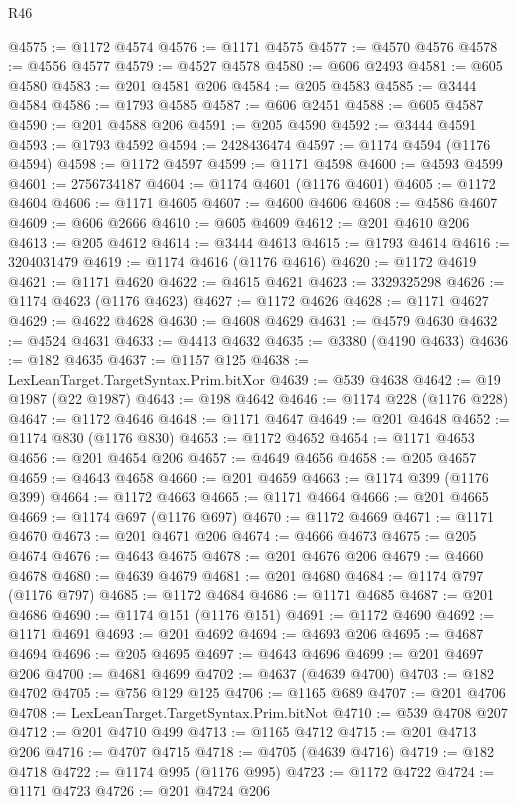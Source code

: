 \begin{lexlean}{R46}
\begin{coremodule}
@4575 := @1172 @4574
@4576 := @1171 @4575
@4577 := @4570 @4576
@4578 := @4556 @4577
@4579 := @4527 @4578
@4580 := @606 @2493
@4581 := @605 @4580
@4583 := @201 @4581 @206
@4584 := @205 @4583
@4585 := @3444 @4584
@4586 := @1793 @4585
@4587 := @606 @2451
@4588 := @605 @4587
@4590 := @201 @4588 @206
@4591 := @205 @4590
@4592 := @3444 @4591
@4593 := @1793 @4592
@4594 := 2428436474
@4597 := @1174 @4594 (@1176 @4594)
@4598 := @1172 @4597
@4599 := @1171 @4598
@4600 := @4593 @4599
@4601 := 2756734187
@4604 := @1174 @4601 (@1176 @4601)
@4605 := @1172 @4604
@4606 := @1171 @4605
@4607 := @4600 @4606
@4608 := @4586 @4607
@4609 := @606 @2666
@4610 := @605 @4609
@4612 := @201 @4610 @206
@4613 := @205 @4612
@4614 := @3444 @4613
@4615 := @1793 @4614
@4616 := 3204031479
@4619 := @1174 @4616 (@1176 @4616)
@4620 := @1172 @4619
@4621 := @1171 @4620
@4622 := @4615 @4621
@4623 := 3329325298
@4626 := @1174 @4623 (@1176 @4623)
@4627 := @1172 @4626
@4628 := @1171 @4627
@4629 := @4622 @4628
@4630 := @4608 @4629
@4631 := @4579 @4630
@4632 := @4524 @4631
@4633 := @4413 @4632
@4635 := @3380 (@4190 @4633)
@4636 := @182 @4635
@4637 := @1157 @125
@4638 := LexLeanTarget.TargetSyntax.Prim.bitXor
@4639 := @539 @4638
@4642 := @19 @1987 (@22 @1987)
@4643 := @198 @4642
@4646 := @1174 @228 (@1176 @228)
@4647 := @1172 @4646
@4648 := @1171 @4647
@4649 := @201 @4648
@4652 := @1174 @830 (@1176 @830)
@4653 := @1172 @4652
@4654 := @1171 @4653
@4656 := @201 @4654 @206
@4657 := @4649 @4656
@4658 := @205 @4657
@4659 := @4643 @4658
@4660 := @201 @4659
@4663 := @1174 @399 (@1176 @399)
@4664 := @1172 @4663
@4665 := @1171 @4664
@4666 := @201 @4665
@4669 := @1174 @697 (@1176 @697)
@4670 := @1172 @4669
@4671 := @1171 @4670
@4673 := @201 @4671 @206
@4674 := @4666 @4673
@4675 := @205 @4674
@4676 := @4643 @4675
@4678 := @201 @4676 @206
@4679 := @4660 @4678
@4680 := @4639 @4679
@4681 := @201 @4680
@4684 := @1174 @797 (@1176 @797)
@4685 := @1172 @4684
@4686 := @1171 @4685
@4687 := @201 @4686
@4690 := @1174 @151 (@1176 @151)
@4691 := @1172 @4690
@4692 := @1171 @4691
@4693 := @201 @4692
@4694 := @4693 @206
@4695 := @4687 @4694
@4696 := @205 @4695
@4697 := @4643 @4696
@4699 := @201 @4697 @206
@4700 := @4681 @4699
@4702 := @4637 (@4639 @4700)
@4703 := @182 @4702
@4705 := @756 @129 @125
@4706 := @1165 @689
@4707 := @201 @4706
@4708 := LexLeanTarget.TargetSyntax.Prim.bitNot
@4710 := @539 @4708 @207
@4712 := @201 @4710 @499
@4713 := @1165 @4712
@4715 := @201 @4713 @206
@4716 := @4707 @4715
@4718 := @4705 (@4639 @4716)
@4719 := @182 @4718
@4722 := @1174 @995 (@1176 @995)
@4723 := @1172 @4722
@4724 := @1171 @4723
@4726 := @201 @4724 @206

\end{coremodule}
\end{lexlean}
